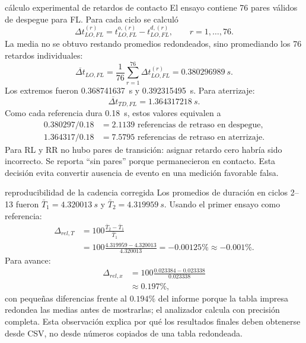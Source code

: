 \documentclass[11pt,letterpaper]{article}
\begin{document}
\begin{workedexample}{cálculo experimental de retardos de contacto}
El ensayo contiene 76 pares válidos de despegue para FL. Para cada ciclo se
calculó
\[
 \Delta t_{LO,FL}^{(r)}=t_{LO,FL}^{o,(r)}-t_{LO,FL}^{d,(r)},
 \qquad r=1,\ldots,76.
\]
La media no se obtuvo restando promedios redondeados, sino promediando los 76
retardos individuales:
\[
 \overline{\Delta t}_{LO,FL}
 =\frac{1}{76}\sum_{r=1}^{76}\Delta t_{LO,FL}^{(r)}
 =\boxed{\SI{0.380296989}{s}}.
\]
Los extremos fueron \SI{0.368741637}{s} y \SI{0.392315495}{s}. Para aterrizaje:
\[
 \overline{\Delta t}_{TD,FL}=\SI{1.364317218}{s}.
\]
Como cada referencia dura \SI{0.18}{s}, estos valores equivalen a
\begin{align*}
 0.380297/0.18&=2.1139\text{ referencias de retraso en despegue},\\
 1.364317/0.18&=7.5795\text{ referencias de retraso en aterrizaje}.
\end{align*}
Para RL y RR no hubo pares de transición: asignar retardo cero habría sido
incorrecto. Se reporta ``sin pares'' porque permanecieron en contacto. Esta
decisión evita convertir ausencia de evento en una medición favorable falsa.
\end{workedexample}

\begin{workedexample}{reproducibilidad de la cadencia corregida}
Los promedios de duración en ciclos 2--13 fueron
$\bar T_1=\SI{4.320013}{s}$ y $\bar T_2=\SI{4.319959}{s}$. Usando el primer
ensayo como referencia:
\begin{align*}
 \Delta_{rel,T}&=100\frac{\bar T_2-\bar T_1}{\bar T_1}\\
 &=100\frac{4.319959-4.320013}{4.320013}
 =\boxed{-0.00125\%}\approx-0.001\%.
\end{align*}
Para avance:
\begin{align*}
 \Delta_{rel,x}&=100\frac{0.023384-0.023338}{0.023338}\\
 &\approx\boxed{0.197\%},
\end{align*}
con pequeñas diferencias frente al $0.194\%$ del informe porque la tabla
impresa redondea las medias antes de mostrarlas; el analizador calcula con
precisión completa. Esta observación explica por qué los resultados finales
deben obtenerse desde CSV, no desde números copiados de una tabla redondeada.
\end{workedexample}
\end{document}
